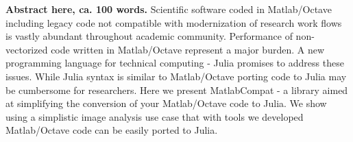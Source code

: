 \textbf{Abstract here, ca. 100 words.}
Scientific software coded in Matlab/Octave including legacy code not compatible with modernization of research work flows is vastly abundant throughout academic community. Performance of non-vectorized code written in Matlab/Octave represent a major burden. A new programming language for technical computing - Julia promises to address these issues. While Julia syntax is similar to Matlab/Octave porting code to Julia may be cumbersome for researchers. Here we present MatlabCompat - a library aimed at simplifying the conversion of your Matlab/Octave code to Julia. We show using a simplistic image analysis use case that with tools we developed Matlab/Octave code can be easily ported to Julia.
  